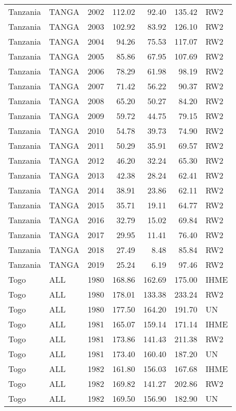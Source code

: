 \begin{longtable}{lllrrrl}
  Tanzania & TANGA & 2002 & 112.02 & 92.40 & 135.42 & RW2 \\ 
  Tanzania & TANGA & 2003 & 102.92 & 83.92 & 126.10 & RW2 \\ 
  Tanzania & TANGA & 2004 & 94.26 & 75.53 & 117.07 & RW2 \\ 
  Tanzania & TANGA & 2005 & 85.86 & 67.95 & 107.69 & RW2 \\ 
  Tanzania & TANGA & 2006 & 78.29 & 61.98 & 98.19 & RW2 \\ 
  Tanzania & TANGA & 2007 & 71.42 & 56.22 & 90.37 & RW2 \\ 
  Tanzania & TANGA & 2008 & 65.20 & 50.27 & 84.20 & RW2 \\ 
  Tanzania & TANGA & 2009 & 59.72 & 44.75 & 79.15 & RW2 \\ 
  Tanzania & TANGA & 2010 & 54.78 & 39.73 & 74.90 & RW2 \\ 
  Tanzania & TANGA & 2011 & 50.29 & 35.91 & 69.57 & RW2 \\ 
  Tanzania & TANGA & 2012 & 46.20 & 32.24 & 65.30 & RW2 \\ 
  Tanzania & TANGA & 2013 & 42.38 & 28.24 & 62.41 & RW2 \\ 
  Tanzania & TANGA & 2014 & 38.91 & 23.86 & 62.11 & RW2 \\ 
  Tanzania & TANGA & 2015 & 35.71 & 19.11 & 64.77 & RW2 \\ 
  Tanzania & TANGA & 2016 & 32.79 & 15.02 & 69.84 & RW2 \\ 
  Tanzania & TANGA & 2017 & 29.95 & 11.41 & 76.40 & RW2 \\ 
  Tanzania & TANGA & 2018 & 27.49 & 8.48 & 85.84 & RW2 \\ 
  Tanzania & TANGA & 2019 & 25.24 & 6.19 & 97.46 & RW2 \\ 
  Togo & ALL & 1980 & 168.86 & 162.69 & 175.00 & IHME \\ 
  Togo & ALL & 1980 & 178.01 & 133.38 & 233.24 & RW2 \\ 
  Togo & ALL & 1980 & 177.50 & 164.20 & 191.70 & UN \\ 
  Togo & ALL & 1981 & 165.07 & 159.14 & 171.14 & IHME \\ 
  Togo & ALL & 1981 & 173.86 & 141.43 & 211.38 & RW2 \\ 
  Togo & ALL & 1981 & 173.40 & 160.40 & 187.20 & UN \\ 
  Togo & ALL & 1982 & 161.80 & 156.03 & 167.68 & IHME \\ 
  Togo & ALL & 1982 & 169.82 & 141.27 & 202.86 & RW2 \\ 
  Togo & ALL & 1982 & 169.50 & 156.90 & 182.90 & UN \\ 

\end{longtable}
